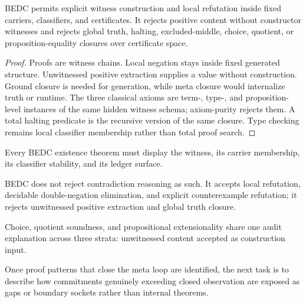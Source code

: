 \begin{theorem}
\label{thm:philosophy-logic-discipline-synthesis}
BEDC permits explicit witness construction and local refutation inside
fixed carriers, classifiers, and certificates. It rejects positive
content without constructor witnesses and rejects global truth,
halting, excluded-middle, choice, quotient, or proposition-equality
closures over certificate space.
\end{theorem}
\begin{proof}
Proofs are witness chains. Local negation stays inside fixed generated
structure. Unwitnessed positive extraction supplies a value without
construction. Ground closure is needed for generation, while meta
closure would internalize truth or runtime. The three classical axioms
are term-, type-, and proposition-level instances of the same hidden
witness schema; axiom-purity rejects them. A total halting predicate is
the recursive version of the same closure. Type checking remains local
classifier membership rather than total proof search.
\end{proof}

\begin{corollary}
\label{cor:philosophy-positive-existence-constructed}
Every BEDC existence theorem must display the witness, its carrier
membership, its classifier stability, and its ledger surface.
\end{corollary}

\begin{corollary}
\label{cor:philosophy-contradiction-not-wholly-rejected}
BEDC does not reject contradiction reasoning as such. It accepts local
refutation, decidable double-negation elimination, and explicit
counterexample refutation; it rejects unwitnessed positive extraction
and global truth closure.
\end{corollary}

\begin{corollary}
\label{cor:philosophy-one-explanation-three-axioms}
Choice, quotient soundness, and propositional extensionality share one
audit explanation across three strata: unwitnessed content accepted as
construction input.
\end{corollary}

\begin{corollary}
\label{cor:philosophy-passage-to-boundary-sockets}
Once proof patterns that close the meta loop are identified, the next
task is to describe how commitments genuinely exceeding closed
observation are exposed as gaps or boundary sockets rather than
internal theorems.
\end{corollary}
